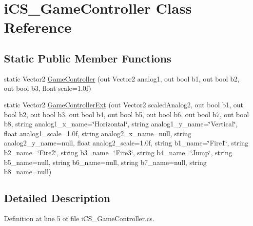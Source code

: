 \hypertarget{classi_c_s___game_controller}{\section{i\+C\+S\+\_\+\+Game\+Controller Class Reference}
\label{classi_c_s___game_controller}
}
\subsection*{Static Public Member Functions}
\begin{DoxyCompactItemize}
\item 
static Vector2 \hyperlink{classi_c_s___game_controller_ac9960ea7f5004f53b4c9b4cdd703f63a}{Game\+Controller} (out Vector2 analog1, out bool b1, out bool b2, out bool b3, float scale=1.\+0f)
\item 
static Vector2 \hyperlink{classi_c_s___game_controller_a4c7504540a3603289a4c5bb57cdb5515}{Game\+Controller\+Ext} (out Vector2 scaled\+Analog2, out bool b1, out bool b2, out bool b3, out bool b4, out bool b5, out bool b6, out bool b7, out bool b8, string analog1\+\_\+x\+\_\+name=\char`\"{}Horizontal\char`\"{}, string analog1\+\_\+y\+\_\+name=\char`\"{}Vertical\char`\"{}, float analog1\+\_\+scale=1.\+0f, string analog2\+\_\+x\+\_\+name=null, string analog2\+\_\+y\+\_\+name=null, float analog2\+\_\+scale=1.\+0f, string b1\+\_\+name=\char`\"{}\+Fire1\char`\"{}, string b2\+\_\+name=\char`\"{}\+Fire2\char`\"{}, string b3\+\_\+name=\char`\"{}\+Fire3\char`\"{}, string b4\+\_\+name=\char`\"{}\+Jump\char`\"{}, string b5\+\_\+name=null, string b6\+\_\+name=null, string b7\+\_\+name=null, string b8\+\_\+name=null)
\end{DoxyCompactItemize}


\subsection{Detailed Description}


Definition at line 5 of file i\+C\+S\+\_\+\+Game\+Controller.\+cs.



